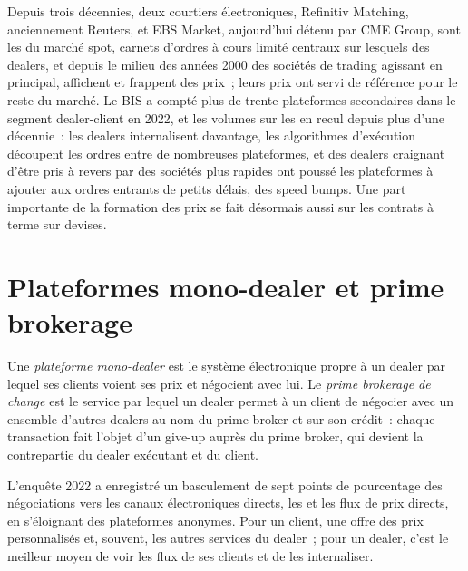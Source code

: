 Depuis trois décennies, deux courtiers électroniques, Refinitiv Matching, anciennement
Reuters, et EBS Market, aujourd'hui détenu par CME Group, sont les  du
marché spot,
carnets d'ordres à cours limité centraux sur lesquels des dealers, et depuis le milieu des années 2000 des sociétés de trading agissant en principal,
affichent et frappent des prix~; leurs prix ont servi de référence pour
le reste du marché. Le BIS a compté plus de trente plateformes secondaires dans le
segment dealer-client en 2022, et les volumes sur les  en recul
depuis plus d'une décennie~: les dealers internalisent davantage, les algorithmes d'exécution découpent
les ordres entre de nombreuses plateformes, et des dealers craignant d'être pris à revers par des sociétés plus rapides
ont poussé les plateformes à ajouter aux ordres entrants de petits délais, des speed bumps.
Une part importante de la formation des prix se fait désormais aussi sur les contrats à terme sur devises.

\section{Plateformes mono-dealer et prime brokerage}

\begin{definition}\label{def:m2:the-fx-market:sdp}
Une \emph{plateforme mono-dealer} est le système électronique propre à un dealer
par lequel ses clients voient ses prix et négocient avec lui.
Le \emph{prime brokerage de change} est le service par lequel un
dealer permet à un client de négocier avec un ensemble d'autres dealers au nom du prime broker
et sur son crédit~: chaque transaction fait l'objet d'un give-up auprès du prime broker, qui devient
la contrepartie du dealer exécutant et du client.
\end{definition}

L'enquête 2022 a enregistré un basculement de sept points de pourcentage des négociations vers
les canaux électroniques directs, les  et les flux de prix directs,
en s'éloignant des plateformes anonymes. Pour un client, une  offre
des prix personnalisés et, souvent, les autres services du dealer~; pour un dealer, c'est
le meilleur moyen de voir les flux de ses clients et de les internaliser.

